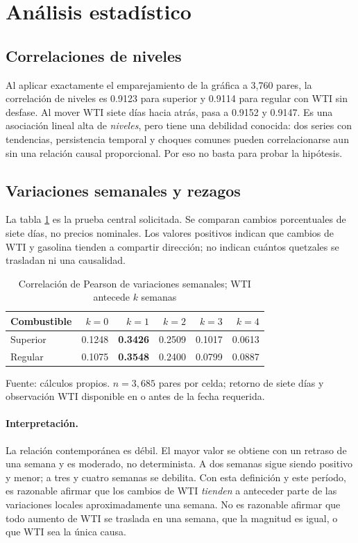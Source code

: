 \documentclass[11pt,letterpaper]{article}
\begin{document}
\section{Análisis estadístico}
\subsection{Correlaciones de niveles}
Al aplicar exactamente el emparejamiento de la gráfica a 3,760 pares, la correlación de niveles es 0.9123 para superior y 0.9114 para regular con WTI sin desfase. Al mover WTI siete días hacia atrás, pasa a 0.9152 y 0.9147. Es una asociación lineal alta de \emph{niveles}, pero tiene una debilidad conocida: dos series con tendencias, persistencia temporal y choques comunes pueden correlacionarse aun sin una relación causal proporcional. Por eso no basta para probar la hipótesis.

\subsection{Variaciones semanales y rezagos}
La tabla \ref{tab:rezagos} es la prueba central solicitada. Se comparan cambios porcentuales de siete días, no precios nominales. Los valores positivos indican que cambios de WTI y gasolina tienden a compartir dirección; no indican cuántos quetzales se trasladan ni una causalidad.

\begin{table}[htbp]
\centering
\caption{Correlación de Pearson de variaciones semanales; WTI antecede $k$ semanas}
\label{tab:rezagos}
\begin{tabular}{lrrrrr}
\toprule
Combustible & $k=0$ & $k=1$ & $k=2$ & $k=3$ & $k=4$ \\
\midrule
Superior & 0.1248 & \textbf{0.3426} & 0.2509 & 0.1017 & 0.0613 \\
Regular & 0.1075 & \textbf{0.3548} & 0.2400 & 0.0799 & 0.0887 \\
\bottomrule
\end{tabular}
\par\smallskip\footnotesize Fuente: cálculos propios. $n=3{,}685$ pares por celda; retorno de siete días y observación WTI disponible en o antes de la fecha requerida.
\end{table}

\paragraph{Interpretación.} La relación contemporánea es débil. El mayor valor se obtiene con un retraso de una semana y es moderado, no determinista. A dos semanas sigue siendo positivo y menor; a tres y cuatro semanas se debilita. Con esta definición y este período, es razonable afirmar que los cambios de WTI \emph{tienden} a anteceder parte de las variaciones locales aproximadamente una semana. No es razonable afirmar que todo aumento de WTI se traslada en una semana, que la magnitud es igual, o que WTI sea la única causa.
\end{document}
